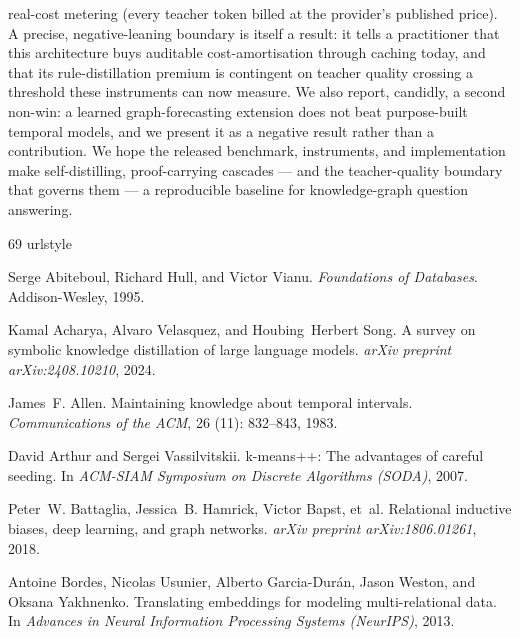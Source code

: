 \documentclass[11pt]{article}
\theoremstyle{plain}
\begin{document}
real-cost metering (every teacher token billed at the provider's published
price). A precise, negative-leaning boundary is itself a result: it tells a
practitioner that this architecture buys auditable cost-amortisation through
caching today, and that its rule-distillation premium is contingent on teacher
quality crossing a threshold these instruments can now measure. We also report,
candidly, a second non-win: a learned graph-forecasting extension does not beat
purpose-built temporal models, and we present it as a negative result rather than
a contribution. We hope the released benchmark, instruments, and implementation
make self-distilling, proof-carrying cascades --- and the teacher-quality
boundary that governs them --- a reproducible baseline for knowledge-graph
question answering.

{\small
\begin{thebibliography}{69}
\providecommand{\natexlab}[1]{#1}
\providecommand{\url}[1]{\texttt{#1}}
\expandafter\ifx\csname urlstyle\endcsname\relax
  \providecommand{\doi}[1]{doi: #1}\else
  \providecommand{\doi}{doi: \begingroup \urlstyle{rm}\Url}\fi

Serge Abiteboul, Richard Hull, and Victor Vianu.
\newblock \emph{Foundations of Databases}.
\newblock Addison-Wesley, 1995.

Kamal Acharya, Alvaro Velasquez, and Houbing~Herbert Song.
\newblock A survey on symbolic knowledge distillation of large language models.
\newblock \emph{arXiv preprint arXiv:2408.10210}, 2024.

James~F. Allen.
\newblock Maintaining knowledge about temporal intervals.
\newblock \emph{Communications of the ACM}, 26 (11):
  832--843, 1983.

David Arthur and Sergei Vassilvitskii.
\newblock k-means++: The advantages of careful seeding.
\newblock In \emph{ACM-SIAM Symposium on Discrete Algorithms (SODA)}, 2007.

Peter~W. Battaglia, Jessica~B. Hamrick, Victor Bapst, et~al.
\newblock Relational inductive biases, deep learning, and graph networks.
\newblock \emph{arXiv preprint arXiv:1806.01261}, 2018.

Antoine Bordes, Nicolas Usunier, Alberto Garcia-Dur{\'a}n, Jason Weston, and
  Oksana Yakhnenko.
\newblock Translating embeddings for modeling multi-relational data.
\newblock In \emph{Advances in Neural Information Processing Systems
  (NeurIPS)}, 2013.


\end{thebibliography}}
\end{document}

